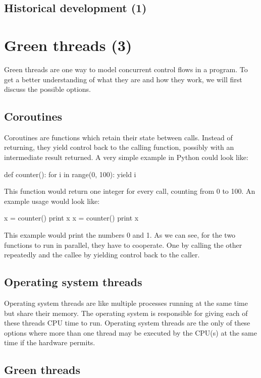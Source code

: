 \documentclass[bachelor,english]{hgbthesis}
\begin{document}
\section{Historical development (1)}

\chapter{Green threads (3)}

Green threads are one way to model concurrent control flows in a program. To get a better understanding of what they are and how they work, we will first discuss the possible options.

\section{Coroutines}

Coroutines are functions which retain their state between calls. Instead of returning, they yield control back to the calling function, possibly with an intermediate result returned. A very simple example in Python could look like:
\begin{GenericCode}
def counter():
    for i in range(0, 100):
	yield i
\end{GenericCode}
This function would return one integer for every call, counting from 0 to 100. An example usage would look like:
\begin{GenericCode}
x = counter()
print x
x = counter()
print x
\end{GenericCode}
This example would print the numbers 0 and 1. As we can see, for the two functions to run in parallel, they have to cooperate. One by calling the other repeatedly and the callee by yielding control back to the caller.

\section{Operating system threads}

Operating system threads are like multiple processes running at the same time but share their memory. The operating system is responsible for giving each of these threads CPU time to run. Operating system threads are the only of these options where more than one thread may be executed by the CPU(s) at the same time if the hardware permits.

\section {Green threads}
\end{document}
